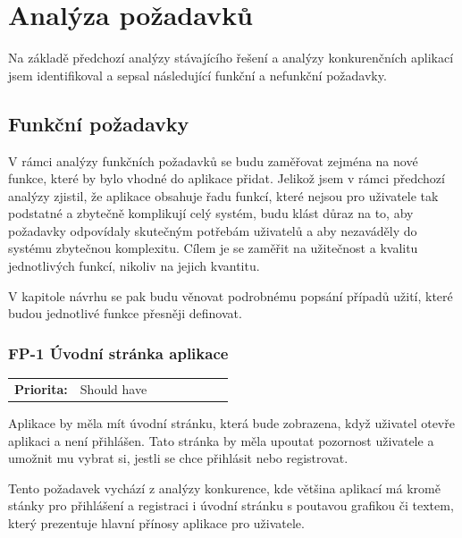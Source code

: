 \section{Analýza požadavků}

Na základě předchozí analýzy stávajícího řešení a analýzy konkurenčních aplikací jsem identifikoval a sepsal následující funkční a nefunkční požadavky.

\subsection{Funkční požadavky}

V rámci analýzy funkčních požadavků se budu zaměřovat zejména na nové funkce, které by bylo vhodné do aplikace přidat. Jelikož jsem v rámci předchozí analýzy zjistil, že aplikace obsahuje řadu funkcí, které nejsou pro uživatele tak podstatné a zbytečně komplikují celý systém, budu klást důraz na to, aby požadavky odpovídaly skutečným potřebám uživatelů a aby nezaváděly do systému zbytečnou komplexitu. Cílem je se zaměřit na užitečnost a kvalitu jednotlivých funkcí, nikoliv na jejich kvantitu.


V kapitole návrhu se pak budu věnovat podrobnému popsání případů užití, které budou jednotlivé funkce přesněji definovat.

\subsubsection{FP-1 Úvodní stránka aplikace}

\begin{tabular}{lp{0.7\linewidth}}
    \textbf{Priorita:} & Should have \\
\end{tabular}

Aplikace by měla mít úvodní stránku, která bude zobrazena, když uživatel otevře aplikaci a není přihlášen. Tato stránka by měla upoutat pozornost uživatele a umožnit mu vybrat si, jestli se chce přihlásit nebo registrovat.

Tento požadavek vychází z analýzy konkurence, kde většina aplikací má kromě stánky pro přihlášení a registraci i úvodní stránku s poutavou grafikou či textem, který prezentuje hlavní přínosy aplikace pro uživatele.

